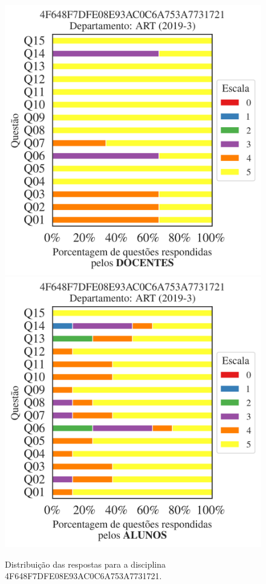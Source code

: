 \documentclass[a4paper,10pt]{article}
\begin{document}
\begin{figure}[h]
\centering
\includegraphics[width=0.485\linewidth]{analise_disciplina_departamento_ART_4F648F7DFE08E93AC0C6A753A7731721_docentes.png}
\includegraphics[width=0.485\linewidth]{analise_disciplina_departamento_ART_4F648F7DFE08E93AC0C6A753A7731721_alunos.png}
\caption{\label{fig:analise_geral_departamento}                Distribuição das respostas para a disciplina 4F648F7DFE08E93AC0C6A753A7731721. }
\end{figure}
\end{document}
